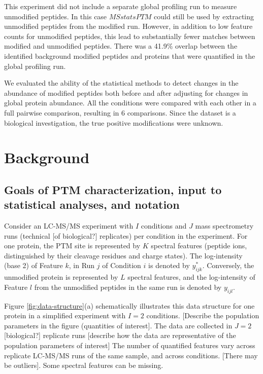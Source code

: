 \documentclass[mcp]{article}
\numberwithin{table}{section}
\def\todo#1{{\color{red}[#1]}}
\begin{document}
\medskip {} This experiment did not include a separate global profiling run to measure unmodified peptides. In this case $MSstatsPTM$ could still be used by extracting unmodified peptides from the modified run. However, in addition to low feature counts for unmodified peptides,  this lead to substantially fewer matches between modified and unmodified peptides. There was a 41.9\% overlap between the identified background modified peptides and proteins that were quantified in the global profiling run.

\medskip {} We evaluated the ability of the statistical methods to detect  changes in the abundance of modified peptides both before and after adjusting for changes in global protein abundance. All the conditions were compared with each other in a full pairwise comparison, resulting in 6 comparisons. Since the dataset is a biological investigation, the true positive modifications were unknown.

\section*{Background}

\subsection*{Goals of PTM characterization, input to statistical analyses, and notation}


Consider an LC-MS/MS experiment with $I$ conditions and $J$ mass spectrometry runs (technical \todo{of biological?} replicates) per condition in the experiment. For one protein, the PTM site is represented by $K$ spectral features (peptide ions, distinguished by their cleavage residues and charge states). The log-intensity (base 2) of Feature $k$, in Run $j$ of Condition $i$ is denoted by $y_{ijk}^{\ast}$. Conversely, the unmodified protein is represented by $L$ spectral features, and the log-intensity of Feature $l$ from the unmodified peptides in the same run is denoted by $y_{ijl}$. 

Figure \ref{fig:data-structure}(a) schematically illustrates this data structure for one protein in a simplified experiment with $I=2$ conditions. \todo{Describe the population parameters in the figure (quantities of interest}.  The data are collected in $J=2$ \todo{biological?} replicate runs \todo{describe how the data are representative of the population parameters of interest}
The number of quantified features vary across replicate LC-MS/MS runs of the same sample, and across conditions. \todo{There may be outliers}. Some spectral features can be missing. 
\end{document}
